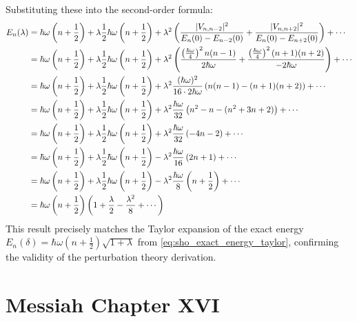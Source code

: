 \begin{example}
  Substituting these into the second-order formula:
  \begin{align} \label{eq:sho_energy_second_order_full}
    E_n (\lambda) &= \hbar \omega \left (n + \frac{1}{2}\right) +
    \lambda \frac{1}{2} \hbar \omega \left(n + \frac{1}{2}\right)
    + \lambda^2 \left( \frac{|V_{n,n-2}|^2}{E_n(0) - E_{n-2}(0)}
    + \frac{|V_{n,n+2}|^2}{E_n(0) - E_{n+2}(0)} \right) + \cdots \\
    &= \hbar \omega \left (n + \frac{1}{2}\right) + \lambda
    \frac{1}{2} \hbar \omega \left(n + \frac{1}{2}\right) +
    \lambda^2 \left( \frac{\left(\frac{\hbar \omega}{4}\right)^2
      n(n-1)}{2\hbar\omega} + \frac{\left(\frac{\hbar
    \omega}{4}\right)^2 (n+1)(n+2)}{-2\hbar\omega}\right)+ \cdots \notag \\
    &= \hbar \omega \left (n + \frac{1}{2}\right) + \lambda
    \frac{1}{2} \hbar \omega \left(n + \frac{1}{2}\right) +
    \lambda^2 \frac{(\hbar \omega)^2}{16 \cdot 2\hbar\omega}
    \left( n(n-1) - (n+1)(n+2)\right)+ \cdots \notag \\
    &= \hbar \omega \left (n + \frac{1}{2}\right) + \lambda
    \frac{1}{2} \hbar \omega \left(n + \frac{1}{2}\right) +
    \lambda^2 \frac{\hbar \omega}{32} \left( n^2-n -
    (n^2+3n+2)\right)+ \cdots \notag \\
    &= \hbar \omega \left (n + \frac{1}{2}\right) + \lambda
    \frac{1}{2} \hbar \omega \left(n + \frac{1}{2}\right) +
    \lambda^2 \frac{\hbar \omega}{32} \left( -4n-2\right)+ \cdots \notag \\
    &= \hbar \omega \left (n + \frac{1}{2}\right) + \lambda
    \frac{1}{2} \hbar \omega \left(n + \frac{1}{2}\right) -
    \lambda^2 \frac{\hbar \omega}{16} \left(2n+1\right)+ \cdots \notag \\
    &= \hbar \omega \left (n + \frac{1}{2}\right) + \lambda
    \frac{1}{2} \hbar \omega \left(n + \frac{1}{2}\right) -
    \lambda^2 \frac{\hbar \omega}{8} \left(n +
    \frac{1}{2}\right)+ \cdots \notag \\
    &= \hbar\omega \left( n + \frac{1}{2}\right) \left(1 +
    \frac{\lambda}{2} - \frac{\lambda^2}{8} + \cdots\right) \notag
  \end{align}
  This result precisely matches the Taylor expansion of the exact
  energy $E_n(\delta) = \hbar\omega \left(n+\frac{1}{2}\right)
  \sqrt{1 + \lambda}$ from \eqref{eq:sho_exact_energy_taylor},
  confirming the validity of the perturbation theory derivation.
\end{example}

\hr
\section{Messiah Chapter XVI}

